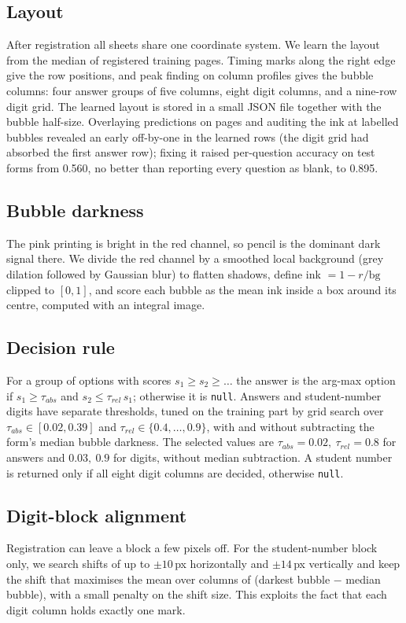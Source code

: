 \documentclass{article}
\begin{document}
\subsection{Layout}
After registration all sheets share one coordinate system. We learn the layout from the median of
registered training pages. Timing marks along the right edge give the row positions, and peak
finding on column profiles gives the bubble columns: four answer groups of five columns, eight
digit columns, and a nine-row digit grid. The learned layout is stored in a small JSON file
together with the bubble half-size. Overlaying predictions on pages and auditing the ink at labelled
bubbles revealed an early off-by-one in the learned rows (the digit grid had absorbed the first
answer row); fixing it raised per-question accuracy on test forms from 0.560, no better than reporting every
question as blank, to 0.895.

\subsection{Bubble darkness}
The pink printing is bright in the red channel, so pencil is the dominant dark signal there. We
divide the red channel by a smoothed local background (grey dilation followed by Gaussian blur)
to flatten shadows, define ink $=1-r/\mathrm{bg}$ clipped to $[0,1]$, and score each bubble as the
mean ink inside a box around its centre, computed with an integral image.

\subsection{Decision rule}
For a group of options with scores $s_1\ge s_2\ge\dots$ the answer is the arg-max option if
$s_1\ge \tau_{abs}$ and $s_2\le\tau_{rel}\,s_1$; otherwise it is \texttt{null}. Answers and
student-number digits have separate thresholds, tuned on the training part by grid search over
$\tau_{abs}\in[0.02,0.39]$ and $\tau_{rel}\in\{0.4,\dots,0.9\}$, with and without subtracting the
form's median bubble darkness. The selected values are $\tau_{abs}=0.02,\ \tau_{rel}=0.8$ for answers
and $0.03,\ 0.9$ for digits, without median subtraction. A student number is returned only if all
eight digit columns are decided, otherwise \texttt{null}.

\subsection{Digit-block alignment}
Registration can leave a block a few pixels off. For the student-number block only, we search
shifts of up to $\pm10$\,px horizontally and $\pm14$\,px vertically and keep the shift that
maximises the mean over columns of (darkest bubble $-$ median bubble), with a small penalty on the
shift size. This exploits the fact that each digit column holds exactly one mark.
\end{document}
